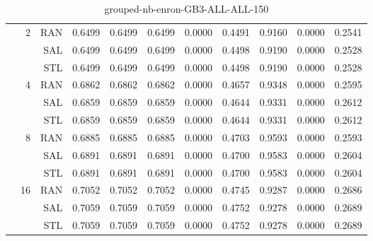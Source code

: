 \begin{center}
\begin{table}[htbp]
\begin{tabular}{ | r | r | r | r | r | r | r | r | r | r | r |}
 & \multirow{3}{*}{2} & RAN & 0.6499 & 0.6499 & 0.6499 & 0.0000 & 0.4491 & 0.9160 & 0.0000 & 0.2541\\ \cline{3-11}
 &   & SAL & 0.6499 & 0.6499 & 0.6499 & 0.0000 & 0.4498 & 0.9190 & 0.0000 & 0.2528\\ \cline{3-11}
 &   & STL & 0.6499 & 0.6499 & 0.6499 & 0.0000 & 0.4498 & 0.9190 & 0.0000 & 0.2528\\ \cline{2-11}
 & \multirow{3}{*}{4} & RAN & 0.6862 & 0.6862 & 0.6862 & 0.0000 & 0.4657 & 0.9348 & 0.0000 & 0.2595\\ \cline{3-11}
 &   & SAL & 0.6859 & 0.6859 & 0.6859 & 0.0000 & 0.4644 & 0.9331 & 0.0000 & 0.2612\\ \cline{3-11}
 &   & STL & 0.6859 & 0.6859 & 0.6859 & 0.0000 & 0.4644 & 0.9331 & 0.0000 & 0.2612\\ \cline{2-11}
 & \multirow{3}{*}{8} & RAN & 0.6885 & 0.6885 & 0.6885 & 0.0000 & 0.4703 & 0.9593 & 0.0000 & 0.2593\\ \cline{3-11}
 &   & SAL & 0.6891 & 0.6891 & 0.6891 & 0.0000 & 0.4700 & 0.9583 & 0.0000 & 0.2604\\ \cline{3-11}
 &   & STL & 0.6891 & 0.6891 & 0.6891 & 0.0000 & 0.4700 & 0.9583 & 0.0000 & 0.2604\\ \cline{2-11}
 & \multirow{3}{*}{16} & RAN & 0.7052 & 0.7052 & 0.7052 & 0.0000 & 0.4745 & 0.9287 & 0.0000 & 0.2686\\ \cline{3-11}
 &   & SAL & 0.7059 & 0.7059 & 0.7059 & 0.0000 & 0.4752 & 0.9278 & 0.0000 & 0.2689\\ \cline{3-11}
 &   & STL & 0.7059 & 0.7059 & 0.7059 & 0.0000 & 0.4752 & 0.9278 & 0.0000 & 0.2689\\ \cline{2-11}
\hline
\end{tabular}
\caption{grouped-nb-enron-GB3-ALL-ALL-150}
\end{table}
\end{center}

